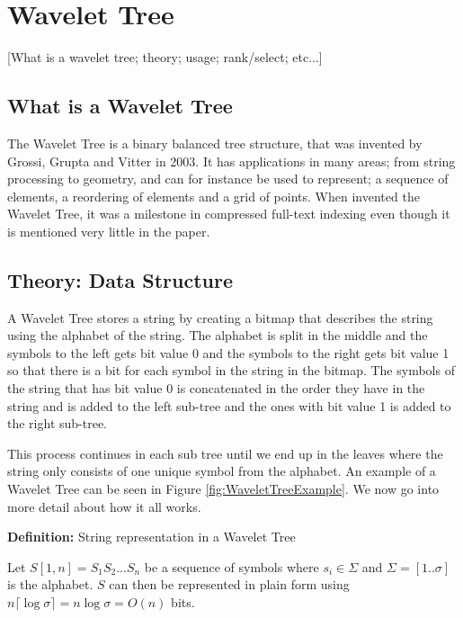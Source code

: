 \section{Wavelet Tree}

[What is a wavelet tree; theory; usage; rank/select; etc...]

\subsection{What is a Wavelet Tree}
The Wavelet Tree is a binary balanced tree structure, that was invented by Grossi, Grupta and Vitter \citep{Grossi:2003:HET:644108.644250} in 2003. It has applications in many areas; from string processing to geometry, and can for instance be used to represent; a sequence of elements, a reordering of elements and a grid of points. When \citep{Grossi:2003:HET:644108.644250} invented the Wavelet Tree, it was a milestone in compressed full-text indexing even though it is mentioned very little in the paper.

\subsection{Theory: Data Structure}
A Wavelet Tree stores a string by creating a bitmap that describes the string using the alphabet of the string. The alphabet is split in the middle and the symbols to the left gets bit value 0 and the symbols to the right gets bit value 1 so that there is a bit for each symbol in the string in the bitmap. The symbols of the string that has bit value 0 is concatenated in the order they have in the string and is added to the left sub-tree and the ones with bit value 1 is added to the right sub-tree. 

This process continues in each sub tree until we end up in the leaves where the string only consists of one unique symbol from the alphabet. An example of a Wavelet Tree can be seen in Figure \ref{fig:WaveletTreeExample}. We now go into more detail about how it all works.

\vspace{0.5 cm}
\begin{mdframed}[nobreak]
\textbf{Definition:} String representation in a Wavelet Tree

Let $S[1,n] = S_1 S_2 ... S_n$ be a sequence of symbols where $s_i \in \Sigma$ and $\Sigma = [1 .. \sigma]$ is the alphabet. $S$ can then be represented in plain form using $n \lceil \log \sigma \rceil = n \log \sigma = O(n)$ bits.
\end{mdframed}
\vspace{0.5 cm}


